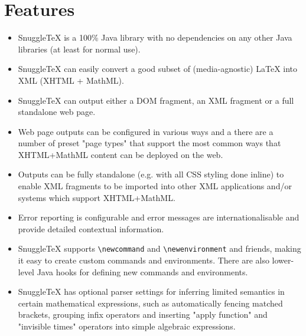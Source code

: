 
\section*{Features}

\begin{itemize}

  \item SnuggleTeX is a 100\% Java library with no dependencies on any other Java libraries
        (at least for normal use).

  \item SnuggleTeX can easily convert a good subset of (media-agnostic) LaTeX
        into XML (XHTML + MathML).

  \item SnuggleTeX can output either a DOM fragment, an XML fragment or a full
        standalone web page.

  \item Web page outputs can be configured in various ways and a there are a
        number of preset "page types" that support the most common ways that XHTML+MathML
        content can be deployed on the web.

  \item Outputs can be fully standalone (e.g. with all CSS styling done inline) to enable
        XML fragments to be imported into other XML applications and/or systems
        which support XHTML+MathML.

  \item Error reporting is configurable and error messages are internationalisable and
        provide detailed contextual information.

  \item SnuggleTeX supports \verb|\newcommand| and \verb|\newenvironment| and
        friends, making it easy to create custom commands and environments. There are
        also lower-level Java hooks for defining new commands and environments.

  \item SnuggleTeX has optional parser settings for inferring limited semantics in
        certain mathematical expressions, such as automatically fencing matched
        brackets, grouping infix operators and inserting "apply function" and
        "invisible times" operators into simple algebraic expressions.

\end{itemize}
